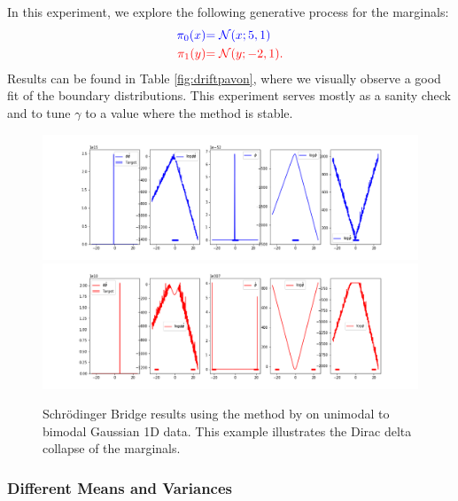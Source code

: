 \documentclass[a4paper,12pt,twoside,openright]{report}
\theoremstyle{definition}
\begin{document}
In this experiment, we explore the following generative process for the marginals:
\begin{align*}
\color{blue}{\pi_0(x)} &\color{blue}{= {\mathcal{N}}(x; 5,  1)} \\
    \color{red}{\pi_1(y)} &\color{red}{= {\mathcal{N}}(y; -2, 1)}. 
\end{align*}
Results can be found in Table \ref{fig:driftpavon}, where we visually observe a good fit of the boundary distributions. This experiment serves mostly as a sanity check and to tune $\gamma$ to a value where the method is stable.

\begin{figure}[t]
    \centering
    \includegraphics[scale=0.4,trim={2.3cm 0.2cm 1.5cm 0}, clip]{images/Pavon/Forward_unimodal_test_working_convex.png} \\\vspace{-0.2cm}
    \includegraphics[scale=0.4,trim={2.3cm 0 1.5cm 1.5cm}, clip]{images/Pavon/Backward_unimodal_test_working_convex.png} 
    \caption{Schrödinger Bridge results using the method by \cite{pavon2018data} on unimodal to bimodal Gaussian 1D data. This example illustrates the Dirac delta collapse of the marginals.}
    \label{fig:small_delta_collapse}
\end{figure}
\subsubsection{Different Means and Variances}
\end{document}
